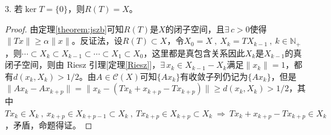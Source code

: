 \begin{proposition}\label{proposition:djm3}
3. 若$\ker T=\{0\}$，则$R(T)=X$。
\end{proposition}
\begin{proof}
由定理\ref{theorem:jszb}可知$R(T)$是$X$的闭子空间，且$\exists \, c>0$使得$\|Tx\| \geq \alpha\|x\|$。反证法，设$R(T) \subset X$，令$X_0=X \ , \ X_k=TX_{k-1} \ , \ k \in \mathbb{N}_+$，则$\cdots \subset X_k \subset X_{k-1} \subset \cdots \subset X_1 \subset X_0$，这里都是真包含关系因此$X_k$是$X_{k-1}$的真闭子空间，则由 Riesz 引理[定理\ref{Riesz}]，$\exists \, x_k \in X_{k-1}-X_k$满足$\|x_k\|=1$，都有$d(x_k,X_k)>1/2$。由$A \in \mathscr{C}(X)$可知$\{Ax_k\}$有收敛子列仍记为$\{Ax_k\}$，但是$\|Ax_k-Ax_{k+p}\|=\|x_k-(Tx_k+x_{k+p}-Tx_{k+p})\| \geq d(x_k,X_k)>1/2$，其中$Tx_k \in X_k \ , \ x_{k+p} \in X_{k+p-1} \subset X_k \ , \ Tx_{k+p} \in X_{k+p} \subset X_k \ \Rightarrow \ Tx_k+x_{k+p}-Tx_{k+p} \in X_k$，矛盾，命题得证。
\end{proof}

